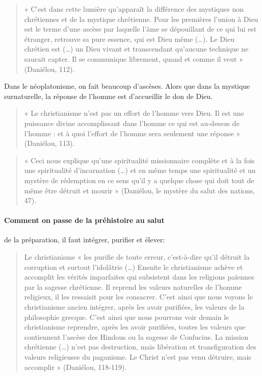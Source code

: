 \begin{quote}
    « C’est dans cette lumière qu’apparaît la différence des mystiques non chrétiennes et de la mystique chrétienne. Pour les premières l’union à Dieu est le terme d’une ascèse par laquelle l’âme se dépouillant de ce qui lui est étranger, retrouve sa pure essence, qui est Dieu même (…). Le Dieu chrétien est (…)  un Dieu vivant et transcendant qu’aucune technique ne saurait capter. Il se communique librement, quand et comme il veut » (Daniélou, 112). 
\end{quote}

Dans le néoplatonisme, on fait beaucoup d'ascèses.
Alors que dans la mystique surnaturelle, la réponse de l'homme est d'accueillir le don de Dieu.
\begin{quote}
    « Le christianisme n’est pas un effort de l’homme vers Dieu. Il est une puissance divine accomplissant dans l’homme ce qui est au-dessus de l’homme : et à quoi l’effort de l’homme sera seulement une réponse » (Daniélou, 113).  
\end{quote}


\begin{quote}
    « Ceci nous explique qu’une spiritualité missionnaire complète et à la fois une spiritualité d’incarnation (…) et en même temps une spiritualité et un mystère de rédemption en ce sens qu’il y a quelque chose qui doit tout de même être détruit et mourir » (Daniélou, le mystère du salut des nations, 47). 
\end{quote}

\paragraph{Comment on passe de la préhistoire au salut} de la préparation, il faut intégrer, purifier et élever: 
\begin{quote}
    Le christianisme « les purifie de toute erreur, c’est-à-dire qu’il détruit la corruption et surtout l’idolâtrie (…) Ensuite le christianisme achève et accomplit les vérités imparfaites qui subsistent dans les religions païennes par la sagesse chrétienne. Il reprend les valeurs naturelles de l’homme religieux, il les ressaisit pour les consacrer. C’est ainsi que nous voyons le christianisme ancien intégrer, après les avoir purifiées, les valeurs de la philosophie grecque. C’est ainsi que nous pourrons voir demain le christianisme reprendre, après les avoir purifiées, toutes les valeurs que contiennent l’ascèse des Hindous ou la sagesse de Confucius. La mission chrétienne (…) n’est pas destruction, mais libération et transfiguration des valeurs religieuses du paganisme. Le Christ n’est pas venu détruire, mais accomplir » (Daniélou, 118-119). 
\end{quote}

